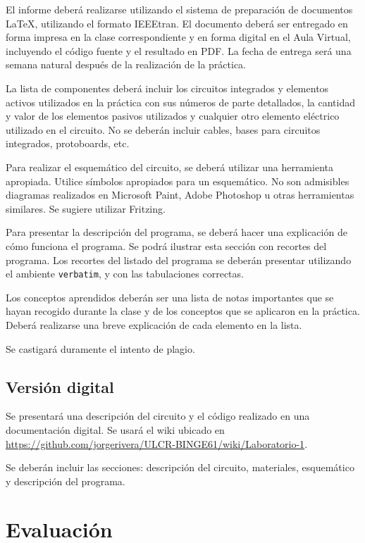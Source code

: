 \documentclass[12pt,letterpaper]{IEEEtran}
\begin{document}
El informe deberá realizarse utilizando el sistema de preparación de documentos \LaTeX, utilizando el formato IEEEtran. El documento deberá ser entregado en forma impresa en la clase correspondiente y en forma digital en el Aula Virtual, incluyendo el código fuente y el resultado en PDF.  La fecha de entrega será una semana natural después de la realización de la práctica.

La lista de componentes deberá incluir los circuitos integrados y elementos activos utilizados en la práctica con sus números de parte detallados, la cantidad y valor de los elementos pasivos utilizados y cualquier otro elemento eléctrico utilizado en el circuito. No se deberán incluir cables, bases para circuitos integrados, protoboards, etc.

Para realizar el esquemático del circuito, se deberá utilizar una herramienta apropiada. Utilice símbolos apropiados para un esquemático. No son admisibles diagramas realizados en Microsoft Paint, Adobe Photoshop u otras herramientas similares. Se sugiere utilizar Fritzing.

Para presentar la descripción del programa, se deberá hacer una explicación de cómo funciona el programa. Se podrá ilustrar esta sección con recortes del programa. Los recortes del listado del programa se deberán presentar utilizando el ambiente \texttt{verbatim}, y con las tabulaciones correctas. 

Los conceptos aprendidos deberán ser una lista de notas importantes que se hayan recogido durante la clase y de los conceptos que se aplicaron en la práctica. Deberá realizarse una breve explicación de cada elemento en la lista.

Se castigará duramente el intento de plagio.

\subsection{Versión digital}

Se presentará una descripción del circuito y el código realizado en una documentación digital. Se usará el wiki ubicado en \url{https://github.com/jorgerivera/ULCR-BINGE61/wiki/Laboratorio-1}. 

Se deberán incluir las secciones: descripción del circuito, materiales, esquemático y descripción del programa.

\section{Evaluación}
\end{document}
